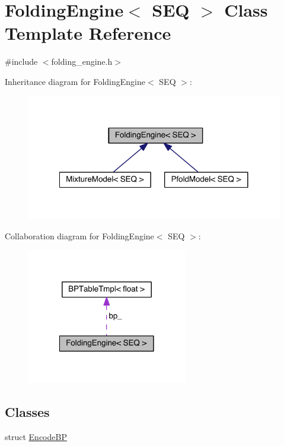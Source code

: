 \hypertarget{class_folding_engine}{\section{Folding\+Engine$<$ S\+E\+Q $>$ Class Template Reference}
\label{class_folding_engine}
}


{\ttfamily \#include $<$folding\+\_\+engine.\+h$>$}



Inheritance diagram for Folding\+Engine$<$ S\+E\+Q $>$\+:
\nopagebreak
\begin{figure}[H]
\begin{center}
\leavevmode
\includegraphics[width=317pt]{class_folding_engine__inherit__graph}
\end{center}
\end{figure}


Collaboration diagram for Folding\+Engine$<$ S\+E\+Q $>$\+:
\nopagebreak
\begin{figure}[H]
\begin{center}
\leavevmode
\includegraphics[width=198pt]{class_folding_engine__coll__graph}
\end{center}
\end{figure}
\subsection*{Classes}
\begin{DoxyCompactItemize}
\item 
struct \hyperlink{struct_folding_engine_1_1_encode_b_p}{Encode\+B\+P}
\end{DoxyCompactItemize}
